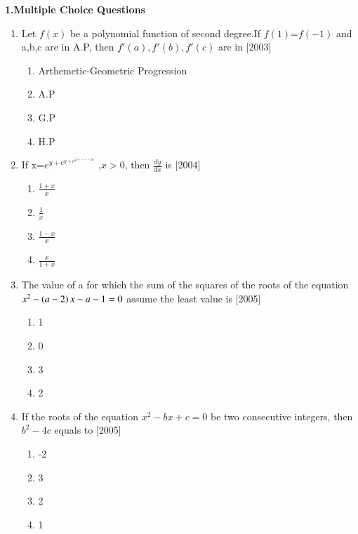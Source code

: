 \documentclass[journal,12pt,twocolumn]{IEEEtran}
\theoremstyle{remark}
\begin{document}
\maketitle \textbf{1.Multiple Choice Questions}
\begin{enumerate}
    \item Let $f(x)$ be a polynomial function of second degree.If $f(1)$=$f(-1)$ and a,b,c are in A.P, then $f'(a),f'(b),f'(c)$ are in
    \hfill[2003]\break
    \begin{enumerate}
    \item Arthemetic-Geometric Progression
    \item A.P
    \item G.P
    \item H.P\\
    
    \end{enumerate}
    \item If x=$e^{y+e^{y+e^{y+---\infty}}}$ ,$x>0$, then $\frac{dy}{dx}$ is
    \hfill[2004]\break
    \begin{enumerate}
    \item $\frac{1+x}{x}$
    \item $\frac{1}{x}$
    \item $\frac{1-x}{x}$
    \item $\frac{x}{1+x}$\\
\end{enumerate}
\item The value of a for which the sum of the squares of the roots of the equation $x^2-\left(a-2\right)x-a-1=0$ assume the least value is
\hfill[2005]\break
\begin{enumerate}
    \item 1
    \item 0
    \item 3
    \item 2\\
    \end{enumerate}
    \item If the roots of the equation $x^2-bx+c=0$ be   two  consecutive integers, then $b^2-4c$  equals  to
    \hfill[2005]\break
    \begin{enumerate}
        \item -2
        \item 3
        \item 2
        \item 1\\
    \end{enumerate}

\end{enumerate}
\end{document}
